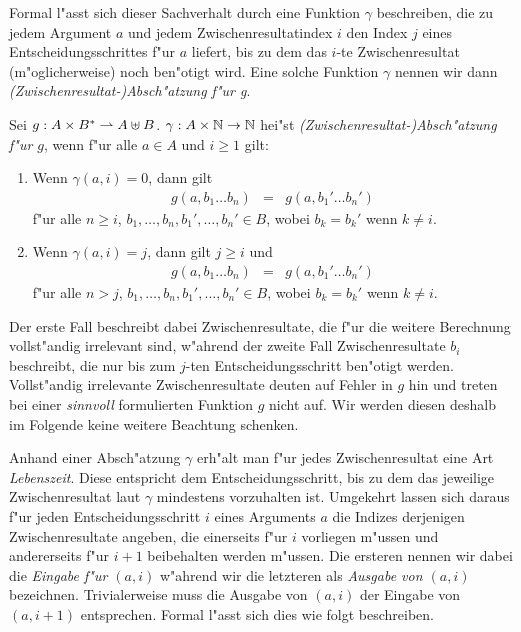 \documentclass[12pt,a4paper]{article}
\begin{document}
Formal l"asst sich dieser Sachverhalt durch eine Funktion $\gamma$ beschreiben, die zu jedem Argument $a$
und jedem Zwischenresultatindex $i$ den Index $j$ eines Entscheidungsschrittes f"ur $a$ liefert,
bis zu dem das $i$-te Zwischenresultat (m"oglicherweise) noch ben"otigt wird. Eine solche Funktion
$\gamma$ nennen wir dann \emph{(Zwischenresultat-)Absch"atzung f"ur g}.

\begin{definition}
  Sei $g: A \times B^* \rightharpoonup A \uplus B$. $\gamma: A \times \mathbb N \to \mathbb N$ hei"st
  \emph{(Zwischenresultat-)Absch"atzung f"ur $g$}, wenn f"ur alle $a \in A$ und $i \ge 1$ gilt:
  \begin{enumerate}
  \item Wenn $\gamma(a,i) = 0$, dann gilt
    \[\begin{array}{rcl}
      g(a,b_1 \ldots b_n) &=& g(a,b_1' \ldots b_n')
    \end{array}\]
    f"ur alle $n \ge i$, $b_1,\ldots,b_n,b_1',\ldots,b_n' \in B$, wobei $b_k = b_k'$ wenn $k \ne i$.
  \item Wenn $\gamma(a,i) = j$, dann gilt $j \ge i$ und
    \[\begin{array}{rcl}
      g(a,b_1 \ldots b_n) &=& g(a,b_1' \ldots b_n')
    \end{array}\]
    f"ur alle $n > j$, $b_1,\ldots,b_n,b_1',\ldots,b_n' \in B$, wobei $b_k = b_k'$ wenn $k \ne i$.
  \end{enumerate}
\end{definition}

Der erste Fall beschreibt dabei Zwischenresultate, die f"ur die weitere Berechnung vollst"andig
irrelevant sind, w"ahrend der zweite Fall Zwischenresultate $b_i$ beschreibt, die nur bis zum
$j$-ten Entscheidungsschritt ben"otigt werden. Vollst"andig irrelevante Zwischenresultate deuten
auf Fehler in $g$ hin und treten bei einer \emph{sinnvoll} formulierten Funktion $g$ nicht auf.
Wir werden diesen deshalb im Folgende keine weitere Beachtung schenken.

Anhand einer Absch"atzung $\gamma$ erh"alt man f"ur jedes Zwischenresultat eine Art \emph{Lebenszeit}.
Diese entspricht dem Entscheidungsschritt, bis zu dem das jeweilige Zwischenresultat laut $\gamma$
mindestens vorzuhalten ist. Umgekehrt lassen sich daraus f"ur jeden Entscheidungsschritt $i$ eines
Arguments $a$ die Indizes derjenigen Zwischenresultate angeben, die einerseits f"ur $i$ vorliegen
m"ussen und andererseits f"ur $i+1$ beibehalten werden m"ussen. Die ersteren nennen wir dabei
die \emph{Eingabe f"ur $(a,i)$} w"ahrend wir die letzteren als \emph{Ausgabe von $(a,i)$} bezeichnen.
Trivialerweise muss die Ausgabe von $(a,i)$ der Eingabe von $(a,i+1)$ entsprechen. Formal l"asst sich
dies wie folgt beschreiben.
\end{document}
